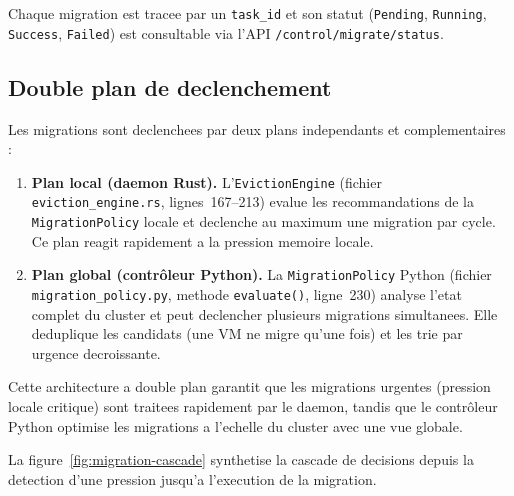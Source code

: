 Chaque migration est tracee par un \texttt{task\_id} et son statut (\texttt{Pending}, \texttt{Running}, \texttt{Success}, \texttt{Failed}) est consultable via l'API \texttt{/control/migrate/status}.

\subsection{Double plan de declenchement}
\label{subsec:double-declenchement}

Les migrations sont declenchees par deux plans independants et complementaires :

\begin{enumerate}
    \item \textbf{Plan local (daemon Rust).} L'\texttt{EvictionEngine} (fichier \texttt{eviction\_engine.rs}, lignes~167--213) evalue les recommandations de la \texttt{MigrationPolicy} locale et declenche au maximum une migration par cycle. Ce plan reagit rapidement a la pression memoire locale.

    \item \textbf{Plan global (contr\^oleur Python).} La \texttt{MigrationPolicy} Python (fichier \texttt{migration\_policy.py}, methode \texttt{evaluate()}, ligne~230) analyse l'etat complet du cluster et peut declencher plusieurs migrations simultanees. Elle deduplique les candidats (une VM ne migre qu'une fois) et les trie par urgence decroissante.
\end{enumerate}

Cette architecture a double plan garantit que les migrations urgentes (pression locale critique) sont traitees rapidement par le daemon, tandis que le contr\^oleur Python optimise les migrations a l'echelle du cluster avec une vue globale.

La figure~\ref{fig:migration-cascade} synthetise la cascade de decisions depuis la detection d'une pression jusqu'a l'execution de la migration.


